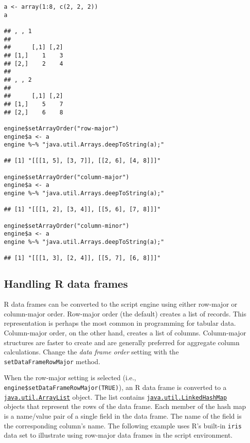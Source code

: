 \documentclass[
article,
11pt, %
a4paper, %
oneside, %
headinclude,footinclude, %
]{scrartcl}
\theoremstyle{definition} %
\theoremstyle{plain} %
\theoremstyle{remark} %
\newcommand{\code}[1]{\texttt{#1}}
\begin{document}
\begin{verbatim}
a <- array(1:8, c(2, 2, 2))
a

## , , 1
##
##      [,1] [,2]
## [1,]    1    3
## [2,]    2    4
##
## , , 2
##
##      [,1] [,2]
## [1,]    5    7
## [2,]    6    8

engine$setArrayOrder("row-major")
engine$a <- a
engine %~% "java.util.Arrays.deepToString(a);"

## [1] "[[[1, 5], [3, 7]], [[2, 6], [4, 8]]]"

engine$setArrayOrder("column-major")
engine$a <- a
engine %~% "java.util.Arrays.deepToString(a);"

## [1] "[[[1, 2], [3, 4]], [[5, 6], [7, 8]]]"

engine$setArrayOrder("column-minor")
engine$a <- a
engine %~% "java.util.Arrays.deepToString(a);"

## [1] "[[[1, 3], [2, 4]], [[5, 7], [6, 8]]]"
\end{verbatim}

\hypertarget{handling-r-data-frames}{}
\subsection{Handling R data frames}

R data frames can be converted to the script engine using either row-major or column-major order. Row-major order (the default) creates a list of records. This representation is perhaps the most common in programming for tabular data. Column-major order, on the other hand, creates a list of columns. Column-major structures are faster to create and are generally preferred for aggregate column calculations. Change the \textit{data frame order} setting with the \code{setDataFrameRowMajor} method.

When the row-major setting is selected (i.e., \code{engine\$setDataFrameRowMajor(TRUE)}), an R data frame is converted to a \href{https://docs.oracle.com/javase/8/docs/api/java/util/ArrayList.html}{\code{java.util.ArrayList}} object. The list contains  \href{https://docs.oracle.com/javase/8/docs/api/java/util/LinkedHashMap.html}{\code{java.util.LinkedHashMap}} objects that represent the rows of the data frame. Each member of the hash map is a name/value pair of a single field in the data frame. The name of the field is the corresponding column's name. The following example uses R's built-in \code{iris} data set to illustrate using row-major data frames in the script environment.
\end{document}
